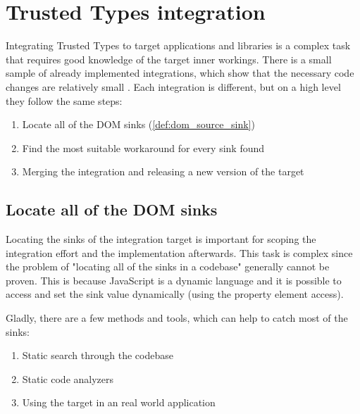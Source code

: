 \chapter{Trusted Types integration}
\label{tt_integration_setup}


Integrating Trusted Types to target applications and libraries is a complex task that requires good
knowledge of the target inner workings. There is a small sample of already implemented integrations,
which show that the necessary code changes are relatively small \cite{tt_integration_list}. Each
integration is different, but on a high level they follow the same steps:

\begin{enumerate}
  \item Locate all of the DOM sinks (\ref{def:dom_source_sink})
  \item Find the most suitable workaround for every sink found
  \item Merging the integration and releasing a new version of the target
\end{enumerate}

\section{Locate all of the DOM sinks}

Locating the sinks of the integration target is important for scoping the integration effort and the
implementation afterwards. This task is complex since the problem of "locating all of the sinks in a
codebase" generally cannot be proven. This is because JavaScript is a dynamic language and it is
possible to access and set the sink value dynamically (using the property element access).

Gladly, there are a few methods and tools, which can help to catch most of the sinks:

\begin{enumerate}
  \item Static search through the codebase
  \item Static code analyzers
  \item Using the target in an real world application
\end{enumerate}

